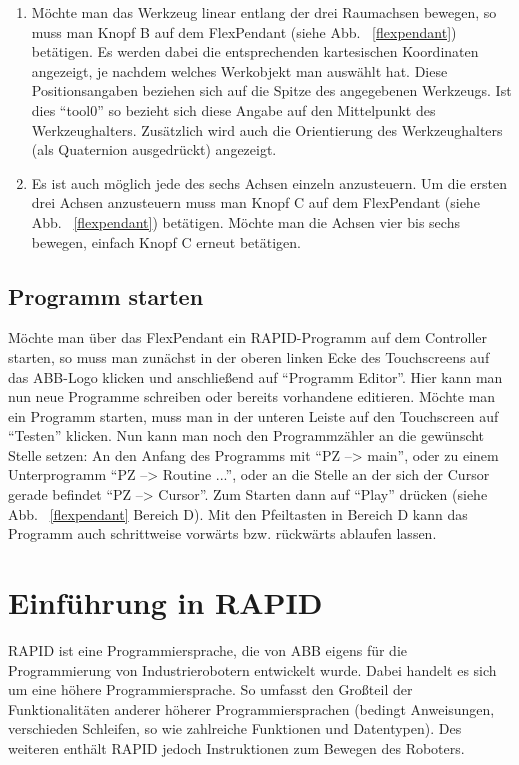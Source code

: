 \begin{enumerate}
\item Möchte man das Werkzeug linear entlang der drei Raumachsen bewegen, so muss man Knopf B auf dem FlexPendant (siehe Abb. ~\ref{flexpendant}) betätigen. Es werden dabei die entsprechenden kartesischen Koordinaten angezeigt, je nachdem welches Werkobjekt man auswählt hat. Diese Positionsangaben beziehen sich auf die Spitze des angegebenen Werkzeugs. Ist dies \enquote{tool0} so bezieht sich diese Angabe auf den Mittelpunkt des Werkzeughalters. Zusätzlich wird auch die Orientierung des Werkzeughalters (als Quaternion ausgedrückt) angezeigt. 

\item Es ist auch möglich jede des sechs Achsen einzeln anzusteuern. Um die ersten drei Achsen anzusteuern muss man Knopf C auf dem FlexPendant (siehe Abb. ~\ref{flexpendant}) betätigen. Möchte man die Achsen vier bis sechs bewegen, einfach Knopf C erneut betätigen. 
\end{enumerate}

\subsection{Programm starten}

Möchte man über das FlexPendant ein RAPID-Programm auf dem Controller starten, so muss man zunächst in der oberen linken Ecke des Touchscreens auf das ABB-Logo klicken und anschließend auf \enquote{Programm Editor}. Hier kann man nun neue Programme schreiben oder bereits vorhandene editieren. Möchte man ein Programm starten, muss man in der unteren Leiste auf den Touchscreen auf \enquote{Testen} klicken. Nun kann man noch den Programmzähler an die gewünscht Stelle setzen: An den Anfang des Programms mit \enquote{PZ --> main}, oder zu einem Unterprogramm \enquote{PZ --> Routine ...}, oder an die Stelle an der sich der Cursor gerade befindet \enquote{PZ --> Cursor}. Zum Starten dann auf \enquote{Play} drücken (siehe Abb. ~\ref{flexpendant} Bereich D). Mit den Pfeiltasten in Bereich D kann das Programm auch schrittweise vorwärts bzw. rückwärts ablaufen lassen.

\section{Einführung in RAPID}
\label{rapidsection}

RAPID ist eine Programmiersprache, die von ABB eigens für die Programmierung von Industrierobotern entwickelt wurde. Dabei handelt es sich um eine höhere Programmiersprache. So umfasst den Großteil der Funktionalitäten anderer höherer Programmiersprachen (bedingt Anweisungen, verschieden Schleifen, so wie zahlreiche Funktionen und Datentypen). Des weiteren enthält RAPID jedoch Instruktionen zum Bewegen des Roboters.

